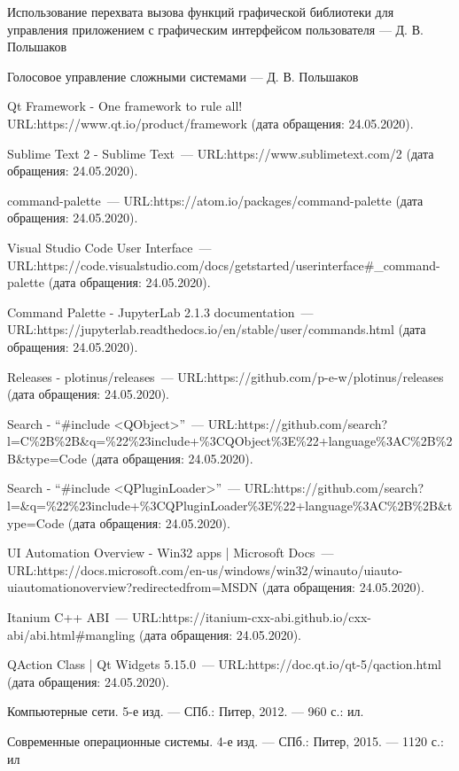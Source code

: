 \renewcommand{\bibname}{Список использованных источников}
\begin{thebibliography}{99}

 Использование перехвата вызова функций графической библиотеки для управления приложением с графическим интерфейсом пользователя --- Д. В. Польшаков

 Голосовое управление сложными системами --- Д. В. Польшаков

 Qt Framework - One framework to rule all!
URL:\@ https://www.qt.io/product/framework
(дата обращения: 24.05.2020).

 Sublime Text 2 \-- Sublime Text~---
URL:\@ https://www.sublimetext.com/2
(дата обращения: 24.05.2020).

 command-palette~---
URL:\@ https://atom.io/packages/command-palette
(дата обращения: 24.05.2020).

 Visual Studio Code User Interface~---
URL:\@ https://code.visualstudio.com/docs/getstarted/userinterface\#\_command-palette
(дата обращения: 24.05.2020).

 Command Palette \-- JupyterLab 2.1.3 documentation~---
URL:\@ https://jupyterlab.readthedocs.io/en/stable/user/commands.html
(дата обращения: 24.05.2020).

 Releases \-- plotinus/releases~---
URL:\@  https://github.com/p-e-w/plotinus/releases
(дата обращения: 24.05.2020).

 Search \-- ``\#include <QObject>''~---
URL:\@ https://github.com/search?l=C\%2B\%2B\&q=\%22\%23include+\%3CQObject\%3E\%22+language\%3AC\%2B\%2B\&type=Code
(дата обращения: 24.05.2020).

 Search \-- ``\#include <QPluginLoader>''~---
URL:\@ https://github.com/search?l=\&q=\%22\%23include+\%3CQPluginLoader\%3E\%22+language\%3AC\%2B\%2B\&type=Code
(дата обращения: 24.05.2020).

 UI Automation Overview \-- Win32 apps | Microsoft Docs~---
URL:\@ https://docs.microsoft.com/en-us/windows/win32/winauto/uiauto-uiautomationoverview?redirectedfrom=MSDN
(дата обращения: 24.05.2020).

 Itanium C++ ABI~---
URL:\@ https://itanium-cxx-abi.github.io/cxx-abi/abi.html\#mangling
(дата обращения: 24.05.2020).

 QAction Class | Qt Widgets 5.15.0~---
URL:\@ https://doc.qt.io/qt-5/qaction.html
(дата обращения: 24.05.2020).

 Компьютерные сети. 5-е изд. — СПб.: Питер, 2012. — 960 с.: ил.

 Современные операционные системы. 4-е изд. — СПб.: Питер, 2015. — 1120 с.: ил

\end{thebibliography}
